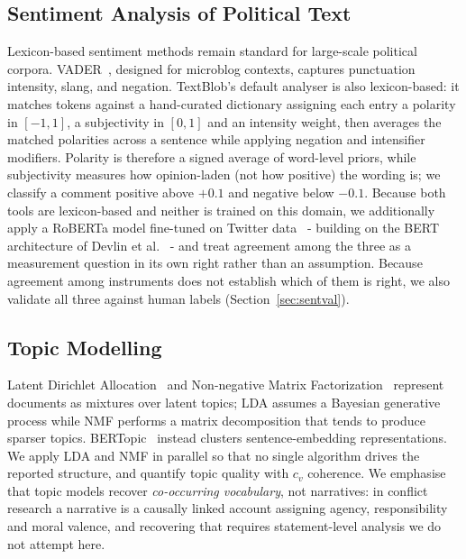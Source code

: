 \documentclass[pdflatex,sn-basic,Numbered,iicol]{sn-jnl}
\begin{document}
\subsection{Sentiment Analysis of Political Text}
Lexicon-based sentiment methods remain standard for large-scale political corpora.
VADER~\cite{hutto2014}, designed for microblog contexts, captures punctuation
intensity, slang, and negation. TextBlob's default analyser is also lexicon-based:
it matches tokens against a hand-curated dictionary assigning each entry a polarity
in $[-1,1]$, a subjectivity in $[0,1]$ and an intensity weight, then averages the
matched polarities across a sentence while applying negation and intensifier
modifiers. Polarity is therefore a signed average of word-level priors, while
subjectivity measures how opinion-laden (not how positive) the wording is; we
classify a comment positive above $+0.1$ and negative below $-0.1$. Because both
tools are lexicon-based and neither is trained on this domain, we additionally apply
a RoBERTa model fine-tuned on Twitter data~\cite{loureiro2022} - building on the
BERT architecture of
Devlin et al.~\cite{devlin2019} - and treat agreement among the three as a
measurement question in its own right rather than an assumption. Because agreement
among instruments does not establish which of them is right, we also validate all
three against human labels (Section~\ref{sec:sentval}).

\subsection{Topic Modelling}
Latent Dirichlet Allocation~\cite{blei2003} and Non-negative Matrix
Factorization~\cite{leeseung2000} represent documents as mixtures over latent
topics; LDA assumes a Bayesian generative process while NMF performs a matrix
decomposition that tends to produce sparser topics. BERTopic~\cite{grootendorst2022}
instead clusters sentence-embedding representations. We apply LDA and NMF in
parallel so that no single algorithm drives the reported structure, and quantify
topic quality with $c_v$ coherence. We emphasise
that topic models recover \emph{co-occurring vocabulary}, not narratives: in conflict
research a narrative is a causally linked account assigning agency, responsibility
and moral valence, and recovering that requires statement-level analysis we do not
attempt here.
\end{document}
